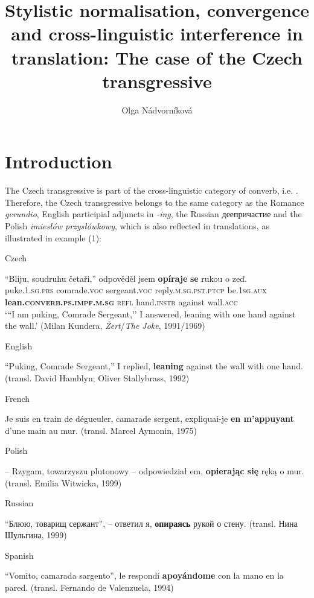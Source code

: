 \documentclass[output=paper,russian]{langsci/langscibook}
\author{Olga Nádvorníková\affiliation{Charles University}}
\title[Stylistic normalisation, convergence \& interference in translation]{Stylistic normalisation, convergence and cross-linguistic interference in translation: The case of the Czech transgressive}
\begin{document}
\maketitle

\section{Introduction}\label{olga:int}

The Czech transgressive is part of the cross-linguistic category of converb, i.e. . Therefore, the Czech transgressive belongs to the same category as the Romance \textit{gerundio}, English participial adjuncts in \textit{-ing}, the Russian {деепричастие} and the Polish \textit{imiesłów przysłówkowy}, which is also reflected in translations, as illustrated in example (1):

\begin{exe}
  \ex
  \begin{xlist}
    \ex Czech\label{olga:ex1}

    \gll ``Bliju, soudruhu četaři,'' odpověděl jsem \textbf{opíraje} \textbf{se} rukou o zeď.\\
    puke.\textsc{1.sg.prs} comrade.\textsc{voc} sergeant.\textsc{voc} reply.\textsc{m.sg.pst.ptcp} be.\textsc{1sg.aux} \textbf{lean.\textsc{converb.ps.impf.m.sg}} \textsc{refl} hand.\textsc{instr} against wall.\textsc{acc}\\
    \trans `{``}I am puking, Comrade Sergeant,'' I answered, leaning with one hand against the wall.' (Milan Kundera, \textit{Žert}\slash \textit{The Joke}, 1991/1969)

    \ex English

    \enquote{Puking, Comrade Sergeant,} I replied, \textbf{leaning} against the wall with one hand. (transl. David Hamblyn; Oliver Stallybrass, 1992)

    \ex French

    Je suis en train de dégueuler, camarade sergent, expliquai-je \textbf{en m'appuyant} d'une main au mur. (transl. Marcel Aymonin, 1975)

    \ex Polish

    -- Rzygam, towarzyszu plutonowy -- odpowiedział em, \textbf{opierając się} ręką o mur. (transl. Emilia Witwicka, 1999)

    \ex Russian

    \enquote{Блюю, товарищ сержант}, -- ответил я, \textbf{опираясь} рукой о стену. (transl. Нина Шульгина, 1999)

    \ex Spanish

    \enquote{Vomito, camarada sargento}, le respondí \textbf{apoyándome} con la mano en la pared. (transl. Fernando de Valenzuela, 1994)
  \end{xlist}
\end{exe}
\end{document}
